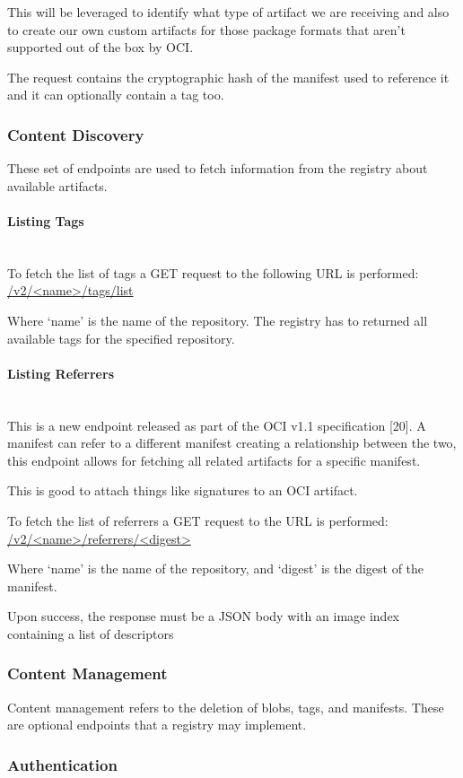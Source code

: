 \documentclass{article}
\newcommand{\subsubsubsection}[1]{\paragraph{#1}\mbox{}\\}
\begin{document}
  This will be leveraged to identify what type of artifact we are receiving and also to create our own custom artifacts for those package formats that aren't supported out of the box by OCI.

  The request contains the cryptographic hash of the manifest used to reference it and it can optionally contain a tag too.

  \subsubsection{Content Discovery}

  These set of endpoints are used to fetch information from the registry about available artifacts.

  \subsubsubsection{Listing Tags}

  To fetch the list of tags a GET request to the following URL is performed: \url{/v2/<name>/tags/list}

  Where `name' is the name of the repository. The registry has to returned all available tags for the specified repository.

  \subsubsubsection{Listing Referrers}

  This is a new endpoint released as part of the OCI v1.1 specification [20]. A manifest can refer to a different manifest creating a relationship between the two, this endpoint allows for fetching all related artifacts for a specific manifest.
  
  This is good to attach things like signatures to an OCI artifact.

  To fetch the list of referrers a GET request to the URL is performed: \url{/v2/<name>/referrers/<digest>}

  Where `name' is the name of the repository, and `digest' is the digest of the manifest.

  Upon success, the response must be a JSON body with an image index containing a list of descriptors

  \subsubsection{Content Management}

  Content management refers to the deletion of blobs, tags, and manifests. These are optional endpoints that a registry may implement.

  \subsubsection{Authentication}
  
\end{document}
